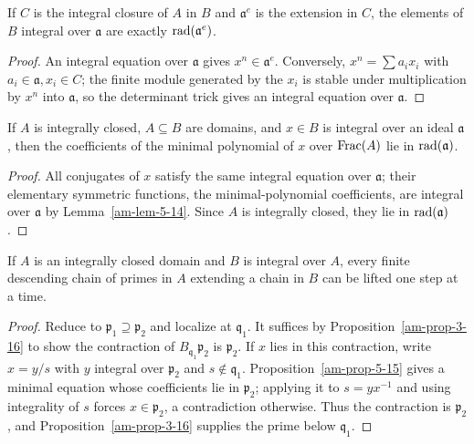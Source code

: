 \begin{lemma}
\label{am-lem-5-14}
\uses{}
If $C$ is the integral closure of $A$ in $B$ and $\mathfrak{a}^e$ is the extension in
$C$, the elements of $B$ integral over $\mathfrak{a}$ are exactly
$\operatorname{rad}(\mathfrak{a}^e)$.
\end{lemma}
\begin{proof}
An integral equation over $\mathfrak{a}$ gives $x^n\in\mathfrak{a}^e$.  Conversely,
$x^n=\sum a_ix_i$ with $a_i\in\mathfrak{a},x_i\in C$; the finite module generated
by the $x_i$ is stable under multiplication by $x^n$ into $\mathfrak{a}$, so the
determinant trick gives an integral equation over $\mathfrak{a}$.
\end{proof}
\begin{proposition}
\label{am-prop-5-15}
\uses{}
If $A$ is integrally closed, $A\subseteq B$ are domains, and $x\in B$ is
integral over an ideal $\mathfrak{a}$, then the coefficients of the minimal polynomial
of $x$ over $\operatorname{Frac}(A)$ lie in $\operatorname{rad}(\mathfrak{a})$.
\end{proposition}
\begin{proof}
All conjugates of $x$ satisfy the same integral equation over $\mathfrak{a}$; their
elementary symmetric functions, the minimal-polynomial coefficients, are
integral over $\mathfrak{a}$ by Lemma~\ref{am-lem-5-14}.  Since $A$ is integrally
closed, they lie in $\operatorname{rad}(\mathfrak{a})$.
\end{proof}
\begin{theorem}
\label{am-thm-5-16}
\uses{}
If $A$ is an integrally closed domain and $B$ is integral over $A$, every finite
descending chain of primes in $A$ extending a chain in $B$ can be lifted one
step at a time.
\end{theorem}
\begin{proof}
Reduce to $\mathfrak{p}_1\supseteq\mathfrak{p}_2$ and localize at $\mathfrak{q}_1$.  It suffices by
Proposition~\ref{am-prop-3-16} to show the contraction of $B_{\mathfrak{q}_1}\mathfrak{p}_2$ is
$\mathfrak{p}_2$.  If $x$ lies in this contraction, write $x=y/s$ with $y$ integral over
$\mathfrak{p}_2$ and $s\notin\mathfrak{q}_1$.  Proposition~\ref{am-prop-5-15} gives a minimal
equation whose coefficients lie in $\mathfrak{p}_2$; applying it to $s=yx^{-1}$ and
using integrality of $s$ forces $x\in\mathfrak{p}_2$, a contradiction otherwise.  Thus
the contraction is $\mathfrak{p}_2$, and Proposition~\ref{am-prop-3-16} supplies the
prime below $\mathfrak{q}_1$.
\end{proof}
